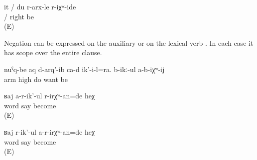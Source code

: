 \begin{exe}
	\ex	\label{ex:She / I was probably right}
	\gll	it	/	du	r-arx-le	r-iχʷ-ide\\
			/		right	be\\
	\glt	{} (E)
\end{exe}

Negation can be expressed on the auxiliary  or on the lexical verb . In each case it has scope over the entire clause.

\begin{exe}
	\ex	\label{ex:He also raised his arms; he probably does not want to (be taken away)}
	\gll	nuˁq-be	aq d-arq'-ib ca-d	ik'-i-l=ra.	b-ikː-ul		a-b-iχʷ-ij\\
		arm	high do 		want	be\\
	\glt	{}

	\ex	\label{ex:‎Probably she was not scolding reprise}
	\begin{xlist}
		\ex	\label{ex:‎Probably she was not scolding@A}
		\gll	ʁaj	a-r-ik'-ul	r-irχʷ-an=de	heχ\\
			word	say	become	\\
		\glt	{} (E)
	
		\ex	\label{ex:‎Probably she was not scolding@B}
		\gll	ʁaj	r-ik'-ul	a-r-irχʷ-an=de	heχ\\
			word	say	become	\\
		\glt	{} (E)
	\end{xlist}
\end{exe}

